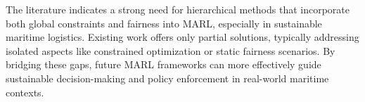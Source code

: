 The literature indicates a strong need for hierarchical methods that incorporate both global constraints and fairness into MARL, especially in sustainable maritime logistics. Existing work offers only partial solutions, typically addressing isolated aspects like constrained optimization or static fairness scenarios. By bridging these gaps, future MARL frameworks can more effectively guide sustainable decision-making and policy enforcement in real-world maritime contexts.